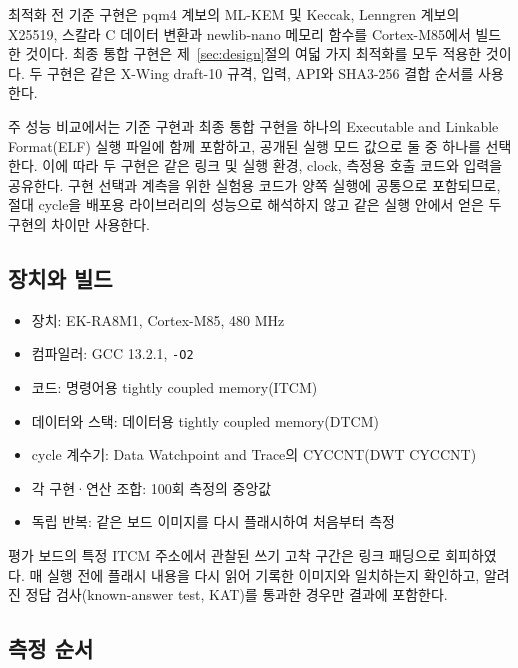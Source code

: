 \documentclass[runningheads,orivec]{llncs}
\newcommand{\xwing}{X-Wing}
\begin{document}
최적화 전 기준 구현은 pqm4 계보의 ML-KEM 및 Keccak, Lenngren 계보의 X25519,
스칼라 C 데이터 변환과 newlib-nano 메모리 함수를 Cortex-M85에서 빌드한 것이다.
최종 통합 구현은 제~\ref{sec:design}절의 여덟 가지 최적화를 모두 적용한 것이다.
두 구현은 같은 \xwing{} draft-10 규격, 입력, API와 SHA3-256 결합 순서를 사용한다.

주 성능 비교에서는 기준 구현과 최종 통합 구현을 하나의 Executable and Linkable
Format(ELF) 실행 파일에 함께 포함하고, 공개된 실행 모드 값으로 둘 중 하나를 선택한다.
이에 따라 두 구현은 같은 링크 및 실행 환경, clock, 측정용 호출 코드와 입력을 공유한다.
구현 선택과 계측을 위한 실험용 코드가 양쪽 실행에 공통으로 포함되므로, 절대 cycle을
배포용 라이브러리의 성능으로 해석하지 않고 같은 실행 안에서 얻은 두 구현의 차이만
사용한다.

\subsection{장치와 빌드}

\begin{itemize}[leftmargin=*,itemsep=1pt]
\item 장치: EK-RA8M1, Cortex-M85, 480 MHz
\item 컴파일러: GCC 13.2.1, \texttt{-O2}
\item 코드: 명령어용 tightly coupled memory(ITCM)
\item 데이터와 스택: 데이터용 tightly coupled memory(DTCM)
\item cycle 계수기: Data Watchpoint and Trace의 CYCCNT(DWT CYCCNT)
\item 각 구현·연산 조합: 100회 측정의 중앙값
\item 독립 반복: 같은 보드 이미지를 다시 플래시하여 처음부터 측정
\end{itemize}

평가 보드의 특정 ITCM 주소에서 관찰된 쓰기 고착 구간은 링크 패딩으로 회피하였다.
매 실행 전에 플래시 내용을 다시 읽어 기록한 이미지와 일치하는지 확인하고, 알려진
정답 검사(known-answer test, KAT)를 통과한 경우만 결과에 포함한다.

\subsection{측정 순서}
\end{document}

